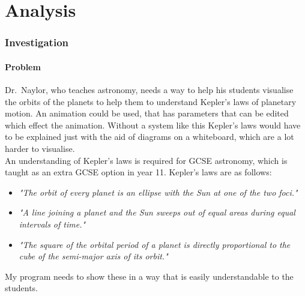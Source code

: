 \part{Analysis}

\section{Investigation}

\subsection{Problem}
Dr.~Naylor, who teaches astronomy, needs a way to help his students visualise
the orbits of the planets to help them to understand Kepler's laws of planetary
motion. An animation could be used, that has parameters that can be
edited which effect the animation. Without a system like this Kepler's laws
would have to be explained just with the aid of diagrams on a whiteboard, which
are a lot harder to visualise. \\

An understanding of Kepler's laws is required for GCSE astronomy, which is
taught as an extra GCSE option in year 11. Kepler's laws are as follows:
\begin{itemize}
	\item \emph{"The orbit of every planet is an ellipse with the Sun at one
			of the two foci."}
	\item \emph{"A line joining a planet and the Sun sweeps out of equal
			areas during equal intervals of time."}
	\item \emph{"The square of the orbital period of a planet is directly
			proportional to the cube of the semi-major axis of its
			orbit."}
\end{itemize}
My program needs to show these in a way that is easily understandable to the
students.


